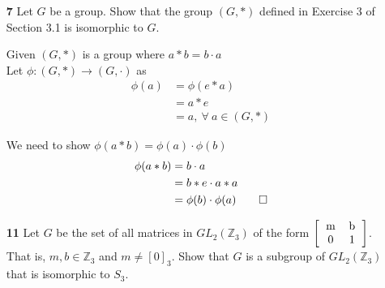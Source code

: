 \documentclass[paper=usletter, fontsize=12pt]{article}
\begin{document}
\begin{itemize}
\begin{itemize}
\begin{cproof}
            \end{cproof}

            \item[\textbf{7}] Let $G$ be a group. Show that the group $(G, *)$
            defined in Exercise 3 of Section 3.1 is isomorphic to $G$.
            \begin{cproof}

                Given $(G, *)$ is a group where $a*b=b\cdot a$\\
                Let $\phi: (G, *) \rightarrow (G, \cdot)$ as
                \begin{align*}
                    \phi(a) & = \phi(e * a)\\
                    & = a * e\\
                    & = a, \ \forall \ a \in (G, *)
                \end{align*}

                We need to show $\phi(a*b)=\phi(a)\cdot\phi(b)$
                \begin{align*}
                    \phi(a*b) & = b \cdot a\\
                    & = b*e \cdot a*a\\
                    & = \phi(b)\cdot\phi(a) \qedhere
                \end{align*}

            \end{cproof}

            \item[\textbf{11}] Let $G$ be the set of all matrices in
            $GL_2(\mathbb{Z}_3)$ of the form $\left[\begin{tabular}{cc}
                    m & b \\
                    0 & 1
                \end{tabular}\right]$. That is, $m, b \in \mathbb{Z}_3$ and
            $m\neq [0]_3$. Show that $G$ is a subgroup of
            $GL_2(\mathbb{Z}_3)$ that is isomorphic to $S_3$.
            \begin{cproof}


\end{cproof}
\end{itemize}
\end{itemize}
\end{document}
